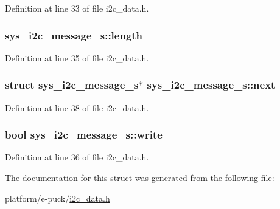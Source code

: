 Definition at line 33 of file i2c\+\_\+data.\+h.

\hypertarget{structsys__i2c__message__s_a1846dd3ca2c59e4a1e68f2edb0c4b191}{}
\subsubsection[{length}]{ sys\+\_\+i2c\+\_\+message\+\_\+s\+::length}\label{structsys__i2c__message__s_a1846dd3ca2c59e4a1e68f2edb0c4b191}


Definition at line 35 of file i2c\+\_\+data.\+h.

\hypertarget{structsys__i2c__message__s_aa435a9b8a1c7fabb600fd1394931a9a8}{}
\subsubsection[{next}]{\setlength{\rightskip}{0pt plus 5cm}struct {\bf sys\+\_\+i2c\+\_\+message\+\_\+s}$\ast$ sys\+\_\+i2c\+\_\+message\+\_\+s\+::next}\label{structsys__i2c__message__s_aa435a9b8a1c7fabb600fd1394931a9a8}


Definition at line 38 of file i2c\+\_\+data.\+h.

\hypertarget{structsys__i2c__message__s_ac3e159ca5b6afac6458dd2b7c991ce4f}{}
\subsubsection[{write}]{\setlength{\rightskip}{0pt plus 5cm}bool sys\+\_\+i2c\+\_\+message\+\_\+s\+::write}\label{structsys__i2c__message__s_ac3e159ca5b6afac6458dd2b7c991ce4f}


Definition at line 36 of file i2c\+\_\+data.\+h.



The documentation for this struct was generated from the following file\+:\begin{DoxyCompactItemize}
\item 
platform/e-\/puck/\hyperlink{i2c__data_8h}{i2c\+\_\+data.\+h}\end{DoxyCompactItemize}
